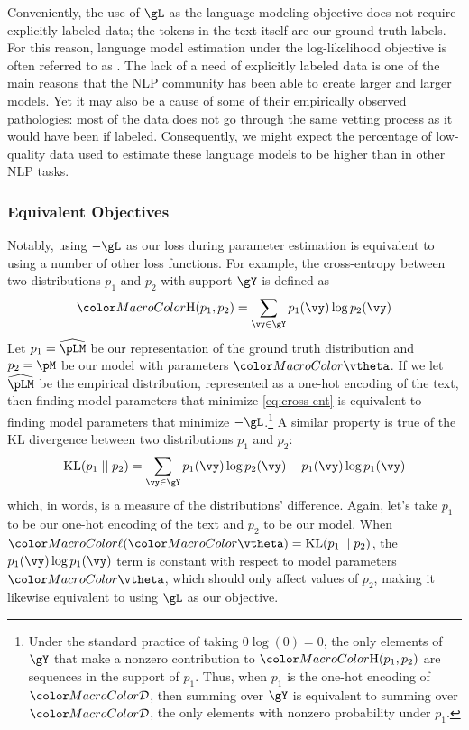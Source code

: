 Conveniently, the use of $\gL$ as the language modeling objective does not require explicitly labeled data; the tokens in the text itself are our ground-truth labels.  For this reason, language model estimation under the log-likelihood objective is often referred to as . The lack of a need of explicitly labeled data is one of the main reasons that the NLP community has been able to create larger and larger models. Yet it may also be a cause of some of their empirically observed pathologies: most of the data does not go through the same vetting process as it would have been if labeled. Consequently, we might expect  the percentage of low-quality data used to estimate these language models to be higher than in other NLP tasks.

\subsubsection{Equivalent Objectives}
Notably, using $-\gL$ as our loss during parameter estimation is equivalent to using a number of other loss functions.  
For example, the cross-entropy between two distributions $p_1$ and $p_2$ with support $\gY$ is defined as
\begin{equation}\label{eq:cross-ent}
    \ent(p_1, p_2) = \sum_{\vy\in\gY}p_1(\vy)\log p_2(\vy) 
\end{equation}
Let $p_1 = \widehat{\pLM}$ be our representation of the ground truth distribution and $p_2 = \pM$ be our model with parameters $\modelparams$. 
If we let $\widehat{\pLM}$ be the empirical distribution, represented as a one-hot encoding of the text, then finding model parameters that minimize \cref{eq:cross-ent} is equivalent to finding model parameters that minimize $-\gL$.\footnote{Under the standard practice of taking $0\log(0) = 0$, the only elements of $\gY$ that make a nonzero contribution to $\ent(p_1, p_2)$ are sequences in the support of $p_1$. Thus, when $p_1$ is the one-hot encoding of $\corpus$, then summing over $\gY$ is equivalent to summing over $\corpus$, the only elements with nonzero probability under $p_1$.} A similar property is true of the $\mathrm{KL}$ divergence between two distributions $p_1$ and $p_2$:
\begin{equation}\label{eq:kl}
    \mathrm{KL}(p_1\mid\mid p_2) = \sum_{\vy\in\gY}p_1(\vy)\log p_2(\vy)  - p_1(\vy)\log p_1(\vy)
\end{equation}
which, in words, is a measure of the distributions' difference.  Again, let's take $p_1$ to be our one-hot encoding of the text and $p_2$ to be our model.  When $\loss(\modelparams) =\mathrm{KL}(p_1\mid\mid p_2)$, the $p_1(\vy)\log p_1(\vy)$ term is constant with respect to model parameters $\modelparams$, which should only affect values of $p_2$, making it likewise equivalent to using $\gL$ as our objective. 

